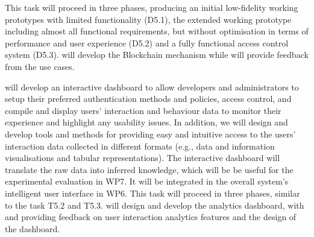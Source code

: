 \begin{Workpackage}{\thewpno}
\begin{Task}
This task will proceed in three phases, producing an initial low-fidelity working prototypes with limited functionality (D5.1), the extended working prototype including almost all functional requirements, but without optimisation in terms of performance and user experience (D5.2) and a fully functional access control system (D5.3). 
\COGNIshort{} will develop the Blockchain mechanism while \SOPRAshort{} will provide feedback from the use cases.
\end{Task}


\begin{Task}
\TaskResults{%
\ref{del:auth1},
\ref{del:auth2},
\ref{del:auth3}
}
\TaskHeader{}

\theTask will develop an interactive dashboard to allow developers and administrators to setup their preferred authentication methods and policies, access control, and compile and display users’ interaction and behaviour data to monitor their experience and highlight any usability issues. In addition, we will design and develop tools and methods for providing easy and intuitive access to the users’ interaction data collected in different formats (e.g., data and information visualisations and tabular representations). %
The interactive dashboard will translate the raw data into inferred knowledge, which will be be useful for the experimental evaluation in WP7. It will be integrated in the overall system's intelligent user interface in WP6. This task will proceed in three phases, similar to the task T5.2 and T5.3.
\COGNIshort{} will design and develop the analytics dashboard, with \SCCHshort{} and \FRQshort{} providing feedback on user interaction analytics features and the design of the dashboard.
\end{Task}


\end{Workpackage}

